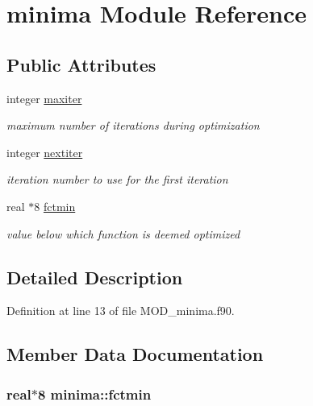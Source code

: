 \hypertarget{classminima}{\section{minima Module Reference}
\label{classminima}
}
\subsection*{Public Attributes}
\begin{DoxyCompactItemize}
\item 
integer \hyperlink{classminima_a56beb25e4bab4444e6ca304089a30f4b}{maxiter}
\begin{DoxyCompactList}\small\item\em maximum number of iterations during optimization \end{DoxyCompactList}\item 
integer \hyperlink{classminima_a9218f8d68c311e63bd9a3887ca9ef090}{nextiter}
\begin{DoxyCompactList}\small\item\em iteration number to use for the first iteration \end{DoxyCompactList}\item 
real $\ast$8 \hyperlink{classminima_a119114dfab081801f627fd4f9691c19a}{fctmin}
\begin{DoxyCompactList}\small\item\em value below which function is deemed optimized \end{DoxyCompactList}\end{DoxyCompactItemize}


\subsection{Detailed Description}


Definition at line 13 of file M\-O\-D\-\_\-minima.\-f90.



\subsection{Member Data Documentation}
\hypertarget{classminima_a119114dfab081801f627fd4f9691c19a}{
\subsubsection[{fctmin}]{\setlength{\rightskip}{0pt plus 5cm}real$\ast$8 minima\-::fctmin}}\label{classminima_a119114dfab081801f627fd4f9691c19a}


